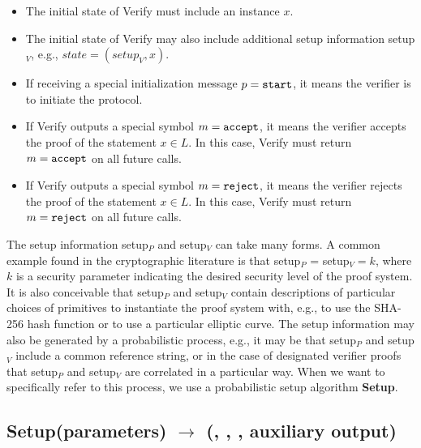 \begin{itemize}
\item The initial state of Verify must include an instance $x$.
\item The initial state of Verify may also include additional setup information setup$_V$, e.g., $state = (setup_V,x)$.
\item If receiving a special initialization message $p = \tt start$, it means the verifier is to initiate the protocol.
\item If Verify outputs a special symbol $m = \tt accept$, it means the verifier accepts the proof of the statement $x \in L$. 
			In this case, Verify must return $m = \tt accept$ on all future calls.
\item If Verify outputs a special symbol $m = \tt reject$, it means the verifier rejects the proof of the statement $x \in L$. 
			In this case, Verify must return $m = \tt reject$ on all future calls.
\end{itemize}
 
	The setup information setup$_P$ and setup$_V$ can take many forms. 
	A common example found in the cryptographic literature is that setup$_P$ = setup$_V = k$, 
where $k$ is a security parameter indicating the desired security level of the proof system. 
	It is also conceivable that setup$_P$ and setup$_V$ contain descriptions of particular choices of primitives to instantiate the proof system with, e.g., to use the SHA-256 hash function or to use a particular elliptic curve. 
	The setup information may also be generated by a probabilistic process, e.g., 
it may be that setup$_P$ and setup$_V$ include a common reference string, 
or in the case of designated verifier proofs that setup$_P$ and setup$_V$ are correlated in a particular way. 
	When we want to specifically refer to this process, we use a probabilistic setup algorithm \textbf{Setup}.


\subsection[Setup]{\textbf{Setup}(parameters) 
$\rightarrow$ (\setR, \setP, \setV, auxiliary output)}
\label{security:syntax:setup}

